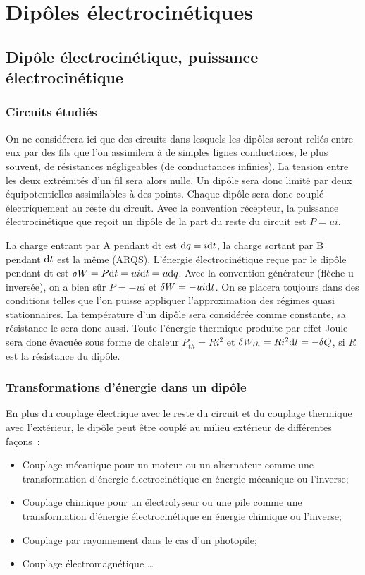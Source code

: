 \chapter{Dipôles électrocinétiques}%
\minitoc{}
\minilof{}
\minilot{}

\section{Dipôle électrocinétique, puissance électrocinétique}%
\subsection{Circuits étudiés}%

On ne considérera ici que des circuits dans lesquels les dipôles seront reliés 
entre eux par des fils que l'on assimilera à de simples lignes conductrices, le 
plus souvent, de résistances négligeables (de conductances infinies). La 
tension entre les deux extrémités d'un fil sera alors nulle. Un dipôle sera 
donc limité par deux équipotentielles assimilables à des points. Chaque dipôle 
sera donc couplé électriquement au reste du circuit. Avec la convention 
récepteur, la puissance électrocinétique que reçoit un dipôle de la part du 
reste du circuit est \(P = ui\).

La charge entrant par A pendant dt est \(\mathrm{d} q = i \mathrm{d} t\), la charge sortant par 
B pendant \(\mathrm{d} t\) est la même (ARQS). L'énergie électrocinétique reçue par le 
dipôle pendant dt est \(\delta W = P \mathrm{d} t = u i \mathrm{d} t = u \mathrm{d} q\). Avec la 
convention générateur (flèche u inversée), on a bien sûr \(P  = - u i\)  et 
\(\delta W = - u i \mathrm{d} t\). On se placera toujours dans des conditions telles 
que l'on puisse appliquer l'approximation des régimes quasi stationnaires. La 
température d'un dipôle sera considérée comme constante, sa résistance le sera 
donc aussi. Toute l'énergie thermique produite par effet Joule sera donc 
évacuée sous forme de chaleur \(P_{th} = R i^2\) et \(\delta W_{th} = R i^2 \mathrm{d} 
t = -\delta Q\), si \(R\) est la résistance du dipôle.

\subsection{Transformations d'énergie dans un dipôle}%
En plus du couplage électrique avec le reste du circuit et du couplage 
thermique avec l'extérieur, le dipôle peut être couplé au milieu extérieur de 
différentes façons~:
\begin{itemize}%
\item Couplage mécanique pour un moteur ou un alternateur comme une 
  transformation d'énergie électrocinétique en énergie mécanique ou l'inverse;
\item Couplage chimique pour un électrolyseur ou une pile comme une 
  transformation d'énergie électrocinétique en énergie chimique ou l'inverse;
\item Couplage par rayonnement dans le cas d'un photopile;
\item Couplage électromagnétique \ldots
\end{itemize}%

